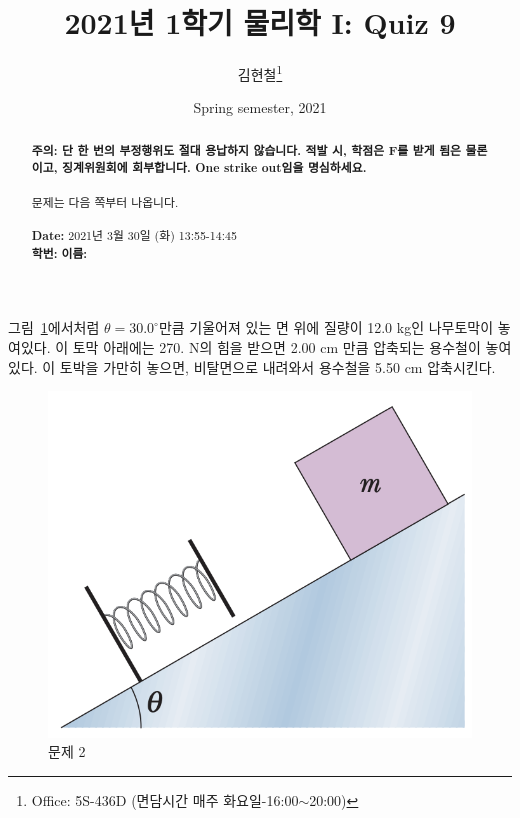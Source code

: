 \documentclass[floatfix,nofootinbib,superscriptaddress,fleqn,preprint]{revtex4}
\begin{document}
\title{\Large 2021년 1학기 물리학 I: Quiz 9}
\author{김현철\footnote{Office: 5S-436D (면담시간 매주
    화요일-16:00$\sim$20:00)}} 
\date{Spring semester, 2021}


\vspace{1.cm}
\begin{abstract}
\noindent \textbf{ {\color{red}주의}: \color{blue} 단 한 번의 부정행위도 절대
  용납하지 않습니다. 적발 시, 학점은 F를 받게 됨은 물론이고,
  징계위원회에 회부합니다. One strike out임을 명심하세요.}\\
\\
문제는 다음 쪽부터 나옵니다.  \\ \\
{\bf Date:} 2021년 3월 30일 (화) 13:55-14:45 
\\
{\bf 학번:} \hspace{4cm}
{\bf 이름:} 

\end{abstract}
\maketitle

그림~\ref{fig:2}에서처럼
$\theta=30.0^\circ$만큼 기울어져 있는 면 위에 질량이 12.0 kg인
나무토막이 놓여있다. 이 토막 아래에는 270. N의 힘을 받으면 2.00 cm
만큼 압축되는 용수철이 놓여있다. 이 토박을 가만히 놓으면, 비탈면으로
내려와서 용수철을 5.50 cm 압축시킨다.
\begin{figure}[ht]
  \centering
\includegraphics[scale=0.5]{Qfig9-2-20210330.png}  
  \caption{문제 2}
  \label{fig:2}
\end{figure}
\end{document}

